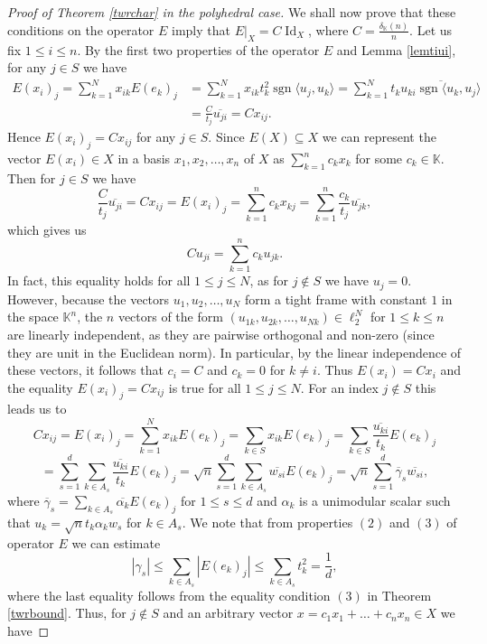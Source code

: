 \documentclass[12pt, reqno]{amsart}
\theoremstyle{definition}
\theoremstyle{remark}
\numberwithin{equation}{section}
\DeclareMathOperator{\sgn}{sgn}
\DeclareMathOperator{\id}{Id}
\begin{document}
\begin{proof}[Proof of Theorem \ref{twrchar} in the polyhedral case]
We shall now prove that these conditions on the operator $E$ imply that $E|_X = C \id_X$, where $C=\frac{\delta_{\mathbb{K}}(n)}{n}.$ Let us fix $1 \leq i \leq  n$. By the first two properties of the operator $E$ and Lemma \ref{lemtiui}, for any $j \in S$ we have
\begin{align*}
E(x_i)_j = \sum_{k=1}^{N} x_{ik} E(e_k)_j &= \sum_{k=1}^{N} x_{ik}t_k^2 \sgn \langle u_j, u_k \rangle=\sum_{k=1}^{N} t_k \overline{u_{ki} \sgn \langle u_k, u_j \rangle} \\
&= \frac{C}{t_j}\overline{u_{ji}} = Cx_{ij}.
\end{align*}
Hence $E(x_i)_j = C x_{ij}$ for any $j \in S$. Since $E(X) \subseteq X$ we can represent the vector $E(x_i) \in X$ in a basis $x_1, x_2, \ldots, x_n$ of $X$ as $\sum_{k=1}^{n} c_kx_k$ for some $c_k \in \mathbb{K}$. Then for $j \in S$ we have
$$\frac{C}{t_j}\overline{u_{ji}} = C x_{ij} =   E(x_i)_j =  \sum_{k=1}^{n} c_k x_{kj} = \sum_{k=1}^{n} \frac{c_k}{t_j} \overline{u_{jk}},$$
which gives us
$$C u_{ji} = \sum_{k=1}^{n} c_k u_{jk}.$$
In fact, this equality holds for all $1 \leq j \leq N$, as for $j \not \in S$ we have $u_j=0$. However, because the vectors $u_1, u_2, \ldots, u_N$ form a tight frame with constant $1$ in the space $\mathbb{K}^n$, the $n$ vectors of the form $(u_{1k}, u_{2k}, \ldots, u_{Nk}) \in \ell_2^N$ for $1 \leq k \leq n$ are linearly independent, as they are pairwise orthogonal and non-zero (since they are unit in the Euclidean norm). In particular, by the linear independence of these vectors, it follows that $c_i=C$ and $c_k = 0$ for $k \neq i$. Thus $E(x_i) = Cx_i$ and the equality $E(x_i)_j = C x_{ij}$ is true for all $1 \leq j \leq N$. For an index $j \not \in S$ this leads us to
$$Cx_{ij} =  E(x_i)_j =  \sum_{k=1}^{N} x_{ik} E(e_k)_j = \sum_{k \in S} x_{ik} E(e_k)_j = \sum_{k \in S} \frac{\overline{u_{ki}}}{t_k} E(e_k)_j$$
$$=\sum_{s=1}^{d} \sum_{k \in A_s} \frac{\overline{u_{ki}}}{t_k} E(e_k)_j = \sqrt{n} \sum_{s=1}^{d} \sum_{k \in A_s} \overline{w_{si}} E(e_k)_j = \sqrt{n} \sum_{s=1}^d \overline{\gamma}_{s}\overline{w_{si}},$$
where $\overline{\gamma}_s = \sum_{k \in A_s} \overline{\alpha_k} E(e_k)_j$ for $1 \leq s \leq d$ and $\alpha_k$ is a unimodular scalar such that $u_k = \sqrt{n} t_k \alpha_k w_s$ for $k \in A_s$. We note that from properties $(2)$ and $(3)$ of operator $E$ we can estimate
$$|\gamma_s| \leq \sum_{k \in A_s} |E(e_k)_j| \leq \sum_{k \in A_s} t_k^2 = \frac{1}{d},$$
where the last equality follows from the equality condition $(3)$ in Theorem \ref{twrbound}. Thus, for $j \not \in S$ and an arbitrary vector $x = c_1x_1 + \ldots + c_nx_n \in X$ we have

\end{proof}
\end{document}
